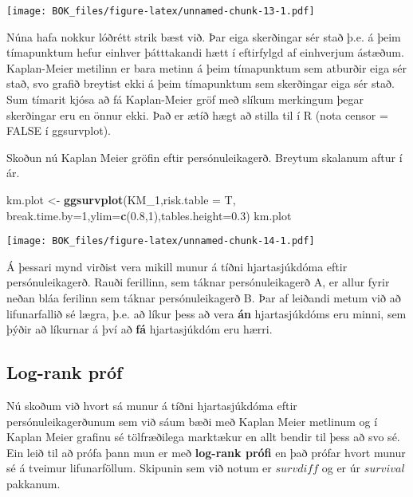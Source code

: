\documentclass[
]{book}
\newenvironment{Shaded}{\begin{snugshade}}{\end{snugshade}}
\newcommand{\DataTypeTok}[1]{\textcolor[rgb]{0.13,0.29,0.53}{#1}}
\newcommand{\DecValTok}[1]{\textcolor[rgb]{0.00,0.00,0.81}{#1}}
\newcommand{\FloatTok}[1]{\textcolor[rgb]{0.00,0.00,0.81}{#1}}
\newcommand{\KeywordTok}[1]{\textcolor[rgb]{0.13,0.29,0.53}{\textbf{#1}}}
\newcommand{\NormalTok}[1]{#1}
\newcommand{\StringTok}[1]{\textcolor[rgb]{0.31,0.60,0.02}{#1}}
\begin{document}
\texttt{[image: BOK\_files/figure-latex/unnamed-chunk-13-1.pdf]}

Núna hafa nokkur lóðrétt strik bæst við. Þar eiga skerðingar sér stað þ.e. á þeim tímapunktum hefur einhver þátttakandi hætt í eftirfylgd af einhverjum ástæðum. Kaplan-Meier metilinn er bara metinn á þeim tímapunktum sem atburðir eiga sér stað, svo grafið breytist ekki á þeim tímapunktum sem skerðingar eiga sér stað. Sum tímarit kjósa að fá Kaplan-Meier gröf með slíkum merkingum þegar skerðingar eru en önnur ekki. Það er ætíð hægt að stilla til í R (nota censor = FALSE í ggsurvplot).

Skoðun nú Kaplan Meier gröfin eftir persónuleikagerð. Breytum skalanum aftur í ár.

\begin{Shaded}
\begin{Highlighting}[]
\NormalTok{km.plot <{-}}\StringTok{ }\KeywordTok{ggsurvplot}\NormalTok{(KM\_}\DecValTok{1}\NormalTok{,}\DataTypeTok{risk.table =}\NormalTok{ T,}
                        \DataTypeTok{break.time.by=}\DecValTok{1}\NormalTok{,}\DataTypeTok{ylim=}\KeywordTok{c}\NormalTok{(}\FloatTok{0.8}\NormalTok{,}\DecValTok{1}\NormalTok{),}\DataTypeTok{tables.height=}\FloatTok{0.3}\NormalTok{) }
\NormalTok{km.plot}
\end{Highlighting}
\end{Shaded}

\texttt{[image: BOK\_files/figure-latex/unnamed-chunk-14-1.pdf]}

Á þessari mynd virðist vera mikill munur á tíðni hjartasjúkdóma eftir persónuleikagerð. Rauði ferillinn, sem táknar persónuleikagerð A, er allur fyrir neðan bláa ferilinn sem táknar persónuleikagerð B. Þar af leiðandi metum við að lifunarfallið sé lægra, þ.e. að líkur þess að vera \textbf{án} hjartasjúkdóms eru minni, sem þýðir að líkurnar á því að \textbf{fá} hjartasjúkdóm eru hærri.

\hypertarget{log-rank-pruxf3f}{%
\subsection{Log-rank próf}\label{log-rank-pruxf3f}}

Nú skoðum við hvort sá munur á tíðni hjartasjúkdóma eftir persónuleikagerðunum sem við sáum bæði með Kaplan Meier metlinum og í Kaplan Meier grafinu sé tölfræðilega marktækur en allt bendir til þess að svo sé. Ein leið til að prófa þann mun er með \textbf{log-rank prófi} en það prófar hvort munur sé á tveimur lifunarföllum. Skipunin sem við notum er \(survdiff\) og er úr \(survival\) pakkanum.
\end{document}
